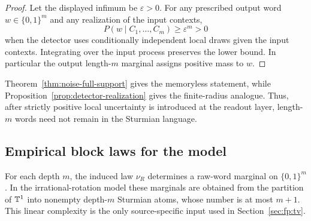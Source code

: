 \begin{proof}
Let the displayed infimum be $\varepsilon>0$.  For any prescribed output word
$w\in\{0,1\}^m$ and any realization of the input contexts,
\[
P(w\mid C_1,\ldots,C_m)\ge \varepsilon^m>0
\]
when the detector uses conditionally independent local draws given the input
contexts.  Integrating over the input process preserves the lower bound.  In
particular the output length-$m$ marginal assigns positive mass to $w$.
\end{proof}
\begin{remark}
Theorem~\ref{thm:noise-full-support} gives the memoryless statement, while Proposition~\ref{prop:detector-realization} gives the finite-radius analogue. Thus, after strictly positive local uncertainty is introduced at the readout layer, length-$m$ words need not remain in the Sturmian language.
\end{remark}

\subsection{Empirical block laws for the model}\label{sec:readout:empirical}

For each depth $m$, the induced law $\nu_R$ determines a raw-word marginal on $\{0,1\}^m$. In the irrational-rotation model these marginals are obtained from the partition of $\mathbb{T}^1$ into nonempty depth-$m$ Sturmian atoms, whose number is at most $m+1$. This linear complexity is the only source-specific input used in Section~\ref{sec:fp:tv}.

